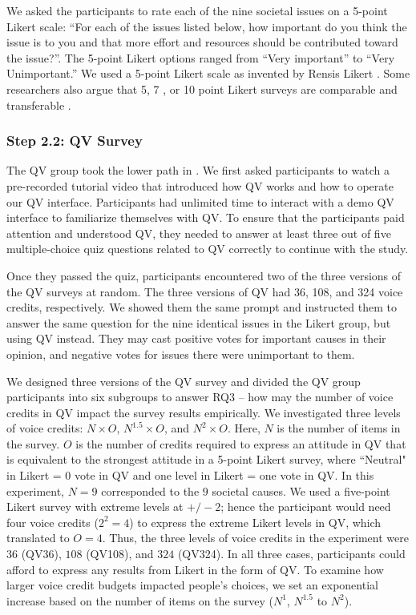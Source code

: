 We asked the participants to rate each of the nine societal issues on a 5-point Likert scale: 
``For each of the issues listed below, how important do you think the issue is to you and that more effort and resources should be contributed toward the issue?''. The 5-point Likert options ranged from ``Very important'' to ``Very Unimportant.'' We used a 5-point Likert scale as invented by Rensis Likert \cite{likert1932technique}. Some researchers also argue that 5, 7 , or 10 point Likert surveys are comparable and transferable \cite{dawes2008data}.


\subsubsection{Step 2.2: QV Survey}
The QV group took the lower path in . We first asked participants to watch a pre-recorded tutorial video that introduced how QV works and how to operate our QV interface. Participants had unlimited time to interact with a demo QV interface to familiarize themselves with QV. To ensure that the participants paid attention and understood QV, they needed to answer at least three out of five multiple-choice quiz questions related to QV correctly to continue with the study.


Once they passed the quiz, participants encountered two of the three versions of the QV surveys at random. The three versions of QV had 36, 108, and 324 voice credits, respectively. We showed them the same prompt and instructed them to answer the same question for the nine identical issues in the Likert group, but using QV instead. They may cast positive votes for important causes in their opinion, and negative votes for issues there were unimportant to them.

We designed three versions of the QV survey and divided the QV group participants into six subgroups to answer RQ3 -- how may the number of voice credits in QV impact the survey results empirically. We investigated three levels of voice credits: $N \times O$, $N^{1.5} \times O$, and $N^2 \times O$. Here, $N$ is the number of items in the survey. $O$ is the number of credits required to express an attitude in QV that is equivalent to the strongest attitude in a 5-point Likert survey, where ``Neutral" in Likert = 0 vote in QV and one level in Likert = one vote in QV. In this experiment, $N=9$ corresponded to the $9$ societal causes. We used a five-point Likert survey with extreme levels at $+/-2$; hence the participant would need four voice credits ($2^2=4$) to express the extreme Likert levels in QV, which translated to $O=4$. Thus, the three levels of voice credits in the experiment were $36$ (QV36), $108$ (QV108), and $324$ (QV324). In all three cases, participants could afford to express any results from Likert in the form of QV. To examine how larger voice credit budgets impacted people's choices, we set an exponential increase based on the number of items on the survey ($N^1$, $N^{1.5}$ to $N^2$).

